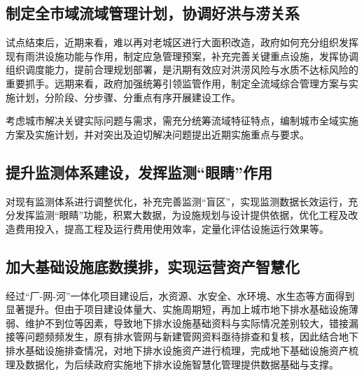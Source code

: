 \documentclass[
]{book}
\begin{document}
\hypertarget{ux5236ux5b9aux5168ux5e02ux57dfux6d41ux57dfux7ba1ux7406ux8ba1ux5212ux534fux8c03ux597dux6d2aux4e0eux6d9dux5173ux7cfb}{%
\subsection{制定全市域流域管理计划，协调好洪与涝关系}\label{ux5236ux5b9aux5168ux5e02ux57dfux6d41ux57dfux7ba1ux7406ux8ba1ux5212ux534fux8c03ux597dux6d2aux4e0eux6d9dux5173ux7cfb}}

试点结束后，近期来看，难以再对老城区进行大面积改造，政府如何充分组织发挥现有雨洪设施功能与作用，制定应急管理预案，补充完善关键重点设施，发挥协调组织调度能力，提前合理规划部署，是汛期有效应对洪涝风险与水质不达标风险的重要抓手。远期来看，政府加强统筹引领监管作用，制定全流域综合管理方案与实施计划，分阶段、分步骤、分重点有序开展建设工作。

考虑城市解决关键实际问题与需求，需充分统筹流域特征特点，编制城市全域实施方案及实施计划，并对突出及迫切解决问题提出近期实施重点与要求。

\hypertarget{ux63d0ux5347ux76d1ux6d4bux4f53ux7cfbux5efaux8bbeux53d1ux6325ux76d1ux6d4bux773cux775bux4f5cux7528}{%
\subsection{提升监测体系建设，发挥监测``眼睛''作用}\label{ux63d0ux5347ux76d1ux6d4bux4f53ux7cfbux5efaux8bbeux53d1ux6325ux76d1ux6d4bux773cux775bux4f5cux7528}}

对现有监测体系进行调整优化，补充完善监测``盲区''，实现监测数据长效运行，充分发挥监测``眼睛''功能，积累大数据，为设施规划与设计提供依据，优化工程及改造费用投入，提高工程及运行费用使用效率，定量化评估设施运行效果等。

\hypertarget{ux52a0ux5927ux57faux7840ux8bbeux65bdux5e95ux6570ux6478ux6392ux5b9eux73b0ux8fd0ux8425ux8d44ux4ea7ux667aux6167ux5316}{%
\subsection{加大基础设施底数摸排，实现运营资产智慧化}\label{ux52a0ux5927ux57faux7840ux8bbeux65bdux5e95ux6570ux6478ux6392ux5b9eux73b0ux8fd0ux8425ux8d44ux4ea7ux667aux6167ux5316}}

经过``厂-网-河''一体化项目建设后，水资源、水安全、水环境、水生态等方面得到显著提升。但由于项目建设体量大、实施周期短，再加上城市地下排水基础设施薄弱、维护不到位等因素，导致地下排水设施基础资料与实际情况差别较大，错接漏接等问题频频发生，原有排水管网与新建管网资料亟待排查和复核，因此结合地下排水基础设施排查情况，对地下排水设施资产进行梳理，完成地下基础设施资产梳理及数据化，为后续政府实施地下排水设施智慧化管理提供数据基础与支撑。
\end{document}
